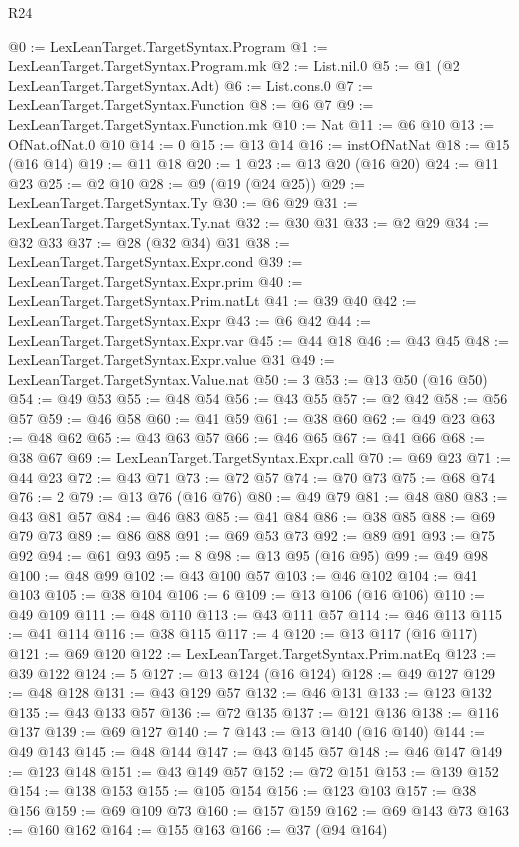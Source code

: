 \begin{lexlean}{R24}
\begin{coremodule}
@0 := LexLeanTarget.TargetSyntax.Program
@1 := LexLeanTarget.TargetSyntax.Program.mk
@2 := List.nil.{0}
@5 := @1 (@2 LexLeanTarget.TargetSyntax.Adt)
@6 := List.cons.{0}
@7 := LexLeanTarget.TargetSyntax.Function
@8 := @6 @7
@9 := LexLeanTarget.TargetSyntax.Function.mk
@10 := Nat
@11 := @6 @10
@13 := OfNat.ofNat.{0} @10
@14 := 0
@15 := @13 @14
@16 := instOfNatNat
@18 := @15 (@16 @14)
@19 := @11 @18
@20 := 1
@23 := @13 @20 (@16 @20)
@24 := @11 @23
@25 := @2 @10
@28 := @9 (@19 (@24 @25))
@29 := LexLeanTarget.TargetSyntax.Ty
@30 := @6 @29
@31 := LexLeanTarget.TargetSyntax.Ty.nat
@32 := @30 @31
@33 := @2 @29
@34 := @32 @33
@37 := @28 (@32 @34) @31
@38 := LexLeanTarget.TargetSyntax.Expr.cond
@39 := LexLeanTarget.TargetSyntax.Expr.prim
@40 := LexLeanTarget.TargetSyntax.Prim.natLt
@41 := @39 @40
@42 := LexLeanTarget.TargetSyntax.Expr
@43 := @6 @42
@44 := LexLeanTarget.TargetSyntax.Expr.var
@45 := @44 @18
@46 := @43 @45
@48 := LexLeanTarget.TargetSyntax.Expr.value @31
@49 := LexLeanTarget.TargetSyntax.Value.nat
@50 := 3
@53 := @13 @50 (@16 @50)
@54 := @49 @53
@55 := @48 @54
@56 := @43 @55
@57 := @2 @42
@58 := @56 @57
@59 := @46 @58
@60 := @41 @59
@61 := @38 @60
@62 := @49 @23
@63 := @48 @62
@65 := @43 @63 @57
@66 := @46 @65
@67 := @41 @66
@68 := @38 @67
@69 := LexLeanTarget.TargetSyntax.Expr.call
@70 := @69 @23
@71 := @44 @23
@72 := @43 @71
@73 := @72 @57
@74 := @70 @73
@75 := @68 @74
@76 := 2
@79 := @13 @76 (@16 @76)
@80 := @49 @79
@81 := @48 @80
@83 := @43 @81 @57
@84 := @46 @83
@85 := @41 @84
@86 := @38 @85
@88 := @69 @79 @73
@89 := @86 @88
@91 := @69 @53 @73
@92 := @89 @91
@93 := @75 @92
@94 := @61 @93
@95 := 8
@98 := @13 @95 (@16 @95)
@99 := @49 @98
@100 := @48 @99
@102 := @43 @100 @57
@103 := @46 @102
@104 := @41 @103
@105 := @38 @104
@106 := 6
@109 := @13 @106 (@16 @106)
@110 := @49 @109
@111 := @48 @110
@113 := @43 @111 @57
@114 := @46 @113
@115 := @41 @114
@116 := @38 @115
@117 := 4
@120 := @13 @117 (@16 @117)
@121 := @69 @120
@122 := LexLeanTarget.TargetSyntax.Prim.natEq
@123 := @39 @122
@124 := 5
@127 := @13 @124 (@16 @124)
@128 := @49 @127
@129 := @48 @128
@131 := @43 @129 @57
@132 := @46 @131
@133 := @123 @132
@135 := @43 @133 @57
@136 := @72 @135
@137 := @121 @136
@138 := @116 @137
@139 := @69 @127
@140 := 7
@143 := @13 @140 (@16 @140)
@144 := @49 @143
@145 := @48 @144
@147 := @43 @145 @57
@148 := @46 @147
@149 := @123 @148
@151 := @43 @149 @57
@152 := @72 @151
@153 := @139 @152
@154 := @138 @153
@155 := @105 @154
@156 := @123 @103
@157 := @38 @156
@159 := @69 @109 @73
@160 := @157 @159
@162 := @69 @143 @73
@163 := @160 @162
@164 := @155 @163
@166 := @37 (@94 @164)

\end{coremodule}
\end{lexlean}
